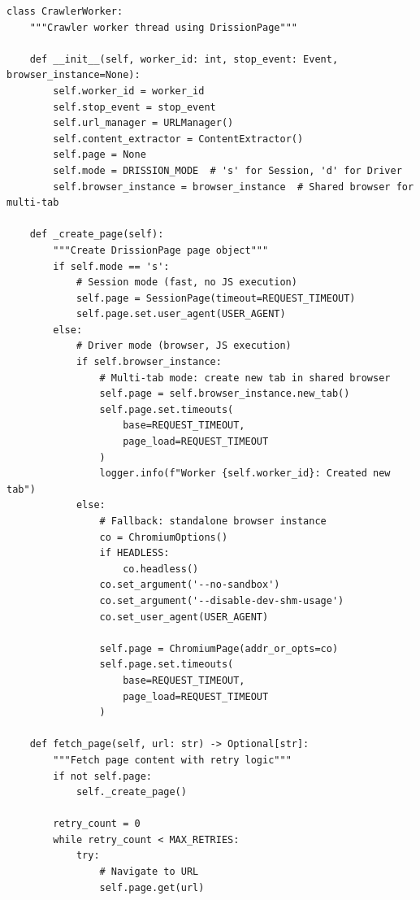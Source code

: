 \begin{lstlisting}
class CrawlerWorker:
    """Crawler worker thread using DrissionPage"""
    
    def __init__(self, worker_id: int, stop_event: Event, browser_instance=None):
        self.worker_id = worker_id
        self.stop_event = stop_event
        self.url_manager = URLManager()
        self.content_extractor = ContentExtractor()
        self.page = None
        self.mode = DRISSION_MODE  # 's' for Session, 'd' for Driver
        self.browser_instance = browser_instance  # Shared browser for multi-tab
    
    def _create_page(self):
        """Create DrissionPage page object"""
        if self.mode == 's':
            # Session mode (fast, no JS execution)
            self.page = SessionPage(timeout=REQUEST_TIMEOUT)
            self.page.set.user_agent(USER_AGENT)
        else:
            # Driver mode (browser, JS execution)
            if self.browser_instance:
                # Multi-tab mode: create new tab in shared browser
                self.page = self.browser_instance.new_tab()
                self.page.set.timeouts(
                    base=REQUEST_TIMEOUT, 
                    page_load=REQUEST_TIMEOUT
                )
                logger.info(f"Worker {self.worker_id}: Created new tab")
            else:
                # Fallback: standalone browser instance
                co = ChromiumOptions()
                if HEADLESS:
                    co.headless()
                co.set_argument('--no-sandbox')
                co.set_argument('--disable-dev-shm-usage')
                co.set_user_agent(USER_AGENT)
                
                self.page = ChromiumPage(addr_or_opts=co)
                self.page.set.timeouts(
                    base=REQUEST_TIMEOUT, 
                    page_load=REQUEST_TIMEOUT
                )
    
    def fetch_page(self, url: str) -> Optional[str]:
        """Fetch page content with retry logic"""
        if not self.page:
            self._create_page()
        
        retry_count = 0
        while retry_count < MAX_RETRIES:
            try:
                # Navigate to URL
                self.page.get(url)
                

\end{lstlisting}
